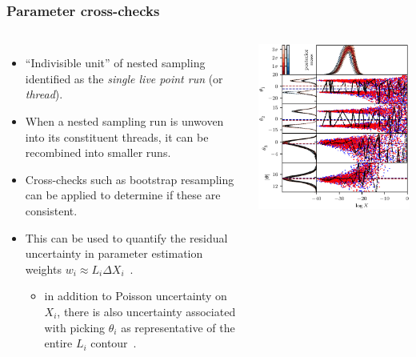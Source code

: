 \documentclass[aspectratio=169]{beamer}
\begin{document}
\begin{frame}
    \frametitle{Parameter cross-checks}
    \begin{columns}
        \begin{itemize}
            \item ``Indivisible unit'' of nested sampling identified as the \emph{single live point run} (or \emph{thread}).
            \item When a nested sampling run is unwoven into its constituent threads, it can be recombined into smaller runs.
            \item Cross-checks such as bootstrap resampling can be applied to determine if these are consistent.
            \item This can be used to quantify the residual uncertainty in parameter estimation weights $w_i\approx L_i \Delta X_i$~.
                \begin{itemize}
                    \item in addition to Poisson uncertainty on $X_i$, there is also uncertainty associated with picking $\theta_i$ as representative of the entire $L_i$ contour~.
                \end{itemize}
        \end{itemize}
        \includegraphics[width=\textwidth]{figures/nestcheck}
    \end{columns}
\end{frame}
\end{document}
